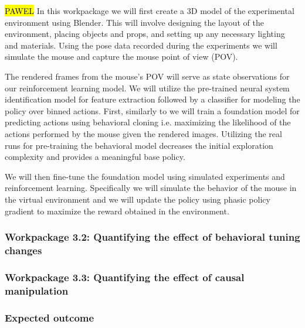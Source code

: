 \documentclass[B2,COG]{ercgrant}
\begin{document}
\hl{PAWEL}
In this workpackage we will first create a 3D model of the experimental environment using Blender. This will involve designing the layout of the environment, placing objects and props, and setting up any necessary lighting and materials.
Using the pose data recorded during the experiments we will simulate the mouse and capture the mouse point of view (POV).

The rendered frames from the mouse's POV will serve as state observations for our reinforcement learning model. We will utilize the pre-trained neural system identification model for feature extraction followed by a classifier for modeling the policy over binned actions.
First, similarly to \cite{Baker2022-ph} we will train a foundation model for predicting actions using behavioral cloning i.e. maximizing the likelihood of the actions performed by the mouse given the rendered images.
Utilizing the real runs for pre-training the behavioral model decreases the initial exploration complexity and provides a meaningful base policy.

We will then fine-tune the foundation model using simulated experiments and reinforcement learning. Specifically we will simulate the behavior of the mouse in the virtual environment and we will update the policy using phasic policy gradient \parencite{Cobbe2020-uk} to maximize the reward obtained in the environment.

\subsubsection{Workpackage 3.2: Quantifying the effect of behavioral tuning changes\hfill{}}

\subsubsection{Workpackage 3.3: Quantifying the effect of causal manipulation\hfill{}}

\subsubsection{Expected outcome} 
\end{document}
